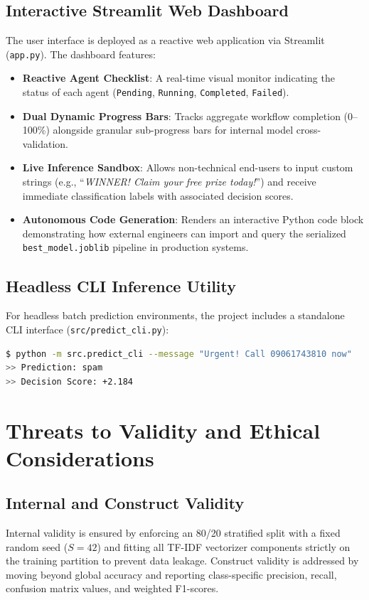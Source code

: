 \documentclass[conference]{IEEEtran}
\begin{document}
\subsection{Interactive Streamlit Web Dashboard}
The user interface is deployed as a reactive web application via Streamlit (\texttt{app.py}). The dashboard features:
\begin{itemize}
    \item \textbf{Reactive Agent Checklist}: A real-time visual monitor indicating the status of each agent (\texttt{Pending}, \texttt{Running}, \texttt{Completed}, \texttt{Failed}).
    \item \textbf{Dual Dynamic Progress Bars}: Tracks aggregate workflow completion (0--100\%) alongside granular sub-progress bars for internal model cross-validation.
    \item \textbf{Live Inference Sandbox}: Allows non-technical end-users to input custom strings (e.g., ``\textit{WINNER! Claim your free prize today!}'') and receive immediate classification labels with associated decision scores.
    \item \textbf{Autonomous Code Generation}: Renders an interactive Python code block demonstrating how external engineers can import and query the serialized \texttt{best\_model.joblib} pipeline in production systems.
\end{itemize}

\subsection{Headless CLI Inference Utility}
For headless batch prediction environments, the project includes a standalone CLI interface (\texttt{src/predict\_cli.py}):
\begin{lstlisting}[language=bash]
$ python -m src.predict_cli --message "Urgent! Call 09061743810 now"
>> Prediction: spam
>> Decision Score: +2.184
\end{lstlisting}

\section{Threats to Validity and Ethical Considerations}
\subsection{Internal and Construct Validity}
Internal validity is ensured by enforcing an 80/20 stratified split with a fixed random seed ($S=42$) and fitting all TF-IDF vectorizer components strictly on the training partition to prevent data leakage. Construct validity is addressed by moving beyond global accuracy and reporting class-specific precision, recall, confusion matrix values, and weighted F1-scores.
\end{document}
